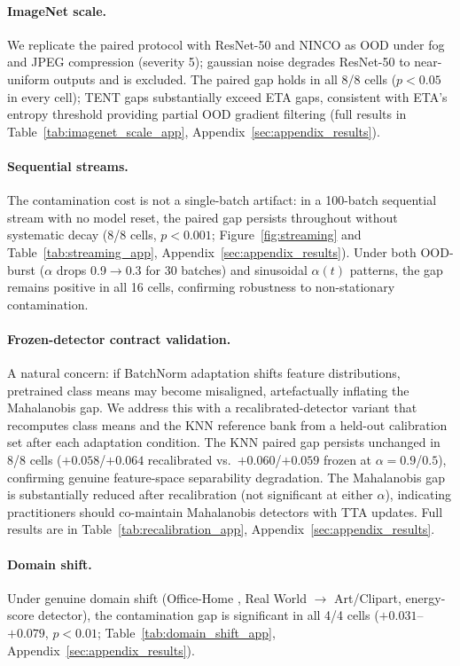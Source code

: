 \paragraph{ImageNet scale.}
We replicate the paired protocol with ResNet-50 and NINCO \citep{ninco} as OOD under fog and JPEG compression (severity 5); gaussian noise degrades ResNet-50 to near-uniform outputs and is excluded.
The paired gap holds in all 8/8 cells ($p < 0.05$ in every cell); TENT gaps substantially exceed ETA gaps, consistent with ETA's entropy threshold providing partial OOD gradient filtering (full results in Table~\ref{tab:imagenet_scale_app}, Appendix~\ref{sec:appendix_results}).

\paragraph{Sequential streams.}
The contamination cost is not a single-batch artifact: in a 100-batch sequential stream with no model reset, the paired gap persists throughout without systematic decay (8/8 cells, $p < 0.001$; Figure~\ref{fig:streaming} and Table~\ref{tab:streaming_app}, Appendix~\ref{sec:appendix_results}).
Under both OOD-burst ($\alpha$ drops 0.9$\to$0.3 for 30 batches) and sinusoidal $\alpha(t)$ patterns, the gap remains positive in all 16 cells, confirming robustness to non-stationary contamination.

\paragraph{Frozen-detector contract validation.}
A natural concern: if BatchNorm adaptation shifts feature distributions, pretrained class means may become misaligned, artefactually inflating the Mahalanobis gap.
We address this with a recalibrated-detector variant that recomputes class means and the KNN reference bank from a held-out calibration set after each adaptation condition.
The KNN paired gap persists unchanged in 8/8 cells ($+0.058$/$+0.064$ recalibrated vs.\ $+0.060$/$+0.059$ frozen at $\alpha{=}0.9$/$0.5$), confirming genuine feature-space separability degradation.
The Mahalanobis gap is substantially reduced after recalibration (not significant at either $\alpha$), indicating practitioners should co-maintain Mahalanobis detectors with TTA updates.
Full results are in Table~\ref{tab:recalibration_app}, Appendix~\ref{sec:appendix_results}.

\paragraph{Domain shift.}
Under genuine domain shift (Office-Home \citep{officehome}, Real World $\to$ Art/Clipart, energy-score detector), the contamination gap is significant in all 4/4 cells ($+0.031$--$+0.079$, $p < 0.01$; Table~\ref{tab:domain_shift_app}, Appendix~\ref{sec:appendix_results}).
